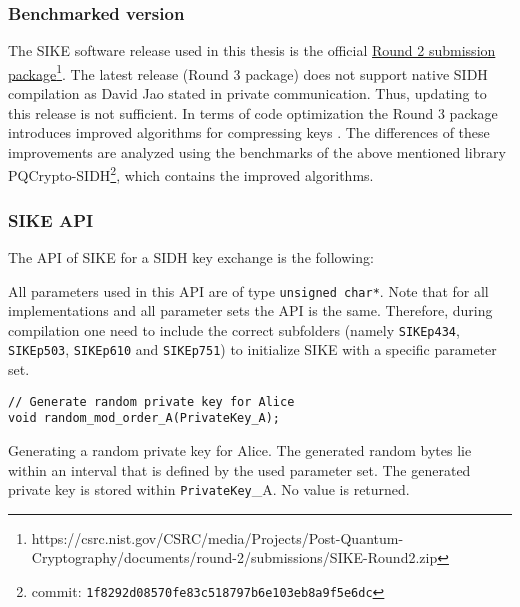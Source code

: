 \subsubsection{Benchmarked version}
The \gls{SIKE} software release used in this thesis is the official \href{https://csrc.nist.gov/CSRC/media/Projects/Post-Quantum-Cryptography/documents/round-2/submissions/SIKE-Round2.zip}{Round 2 submission package}\footnote{https://csrc.nist.gov/CSRC/media/Projects/Post-Quantum-Cryptography/documents/round-2/submissions/SIKE-Round2.zip}. The latest release (Round 3 package) does not support native SIDH compilation as David Jao stated in private communication. Thus, updating to this release is not sufficient. In terms of code optimization the Round 3 package introduces improved algorithms for compressing keys \parencite{sike2020spec}. The differences of these improvements are analyzed using the benchmarks of the above mentioned library \gls{PQCrypto-SIDH}\footnote{commit: \texttt{1f8292d08570fe83c518797b6e103eb8a9f5e6dc}}, which contains the improved algorithms.

\subsubsection{\gls{SIKE} API}
The API of \gls{SIKE} for a \gls{SIDH} key exchange is the following:

All parameters used in this API are of type \texttt{unsigned char*}. Note that for all implementations and all parameter sets the API is the same. Therefore, during compilation one need to include the correct subfolders (namely \texttt{SIKEp434}, \texttt{SIKEp503}, \texttt{SIKEp610} and \texttt{SIKEp751}) to initialize \gls{SIKE} with a specific parameter set.


\begin{lstlisting}[]
// Generate random private key for Alice
void random_mod_order_A(PrivateKey_A);
\end{lstlisting}
Generating a random private key for Alice. The generated random bytes lie within an interval that is defined by the used parameter set. The generated private key is stored within \textcolor{keywordcol}{\texttt{PrivateKey}\_A}. No value is returned.\\


